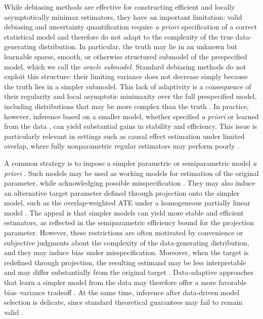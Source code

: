 \documentclass[11pt]{article}
\theoremstyle{definition}
\begin{document}
While debiasing methods are effective for constructing efficient and locally asymptotically minimax estimators, they have an important limitation: valid debiasing and uncertainty quantification require \textit{a priori} specification of a correct statistical model and therefore do not adapt to the complexity of the true data-generating distribution. In particular, the truth may lie in an unknown but learnable sparse, smooth, or otherwise structured submodel of the prespecified model, which we call the \emph{oracle submodel}. Standard debiasing methods do not exploit this structure: their limiting variance does not decrease simply because the truth lies in a simpler submodel. This lack of adaptivity is a consequence of their regularity and local asymptotic minimaxity over the full prespecified model, including distributions that may be more complex than the truth \citep{hajek1972local, vandervaart2000asymptotic}. In practice, however, inference based on a smaller model, whether specified \textit{a priori} \citep{imbensOverlapEstimand2006} or learned from the data \citep{moosavi2023costs}, can yield substantial gains in stability and efficiency. This issue is particularly relevant in settings such as causal effect estimation under limited overlap, where fully nonparametric regular estimators may perform poorly \citep{CTMLE, ATEsupereff, d2021deconfounding, moosavi2023costs}.


 
 
A common strategy is to impose a simpler parametric or semiparametric model \textit{a priori} \citep{imbensOverlapEstimand2006, li2019overlapWeights, vansteelandt2022assumption, vansteelandt2024assumption}. Such models may be used as working models for estimation of the original parameter, while acknowledging possible misspecification \citep{white1982MLErobust, buja2019models, buja2019models2}. They may also induce an alternative target parameter defined through projection onto the simpler model, such as the overlap-weighted ATE under a homogeneous partially linear model \citep{robinson1988root, imbensOverlapEstimand2006, li2019overlapWeights}. The appeal is that simpler models can yield more stable and efficient estimators, as reflected in the semiparametric efficiency bound for the projection parameter. However, these restrictions are often motivated by convenience or subjective judgments about the complexity of the data-generating distribution, and they may induce bias under misspecification. Moreover, when the target is redefined through projection, the resulting estimand may be less interpretable and may differ substantially from the original target \citep{whitney2020comment}. Data-adaptive approaches that learn a simpler model from the data may therefore offer a more favorable bias--variance tradeoff \citep{CTMLE, moosavi2023costs, van2024adaptive, li2025regularized}. At the same time, inference after data-driven model selection is delicate, since standard theoretical guarantees may fail to remain valid \citep{bauer1988model, potscher1991effects, buhlmann1999efficient, hjort2003frequentist, bunea2004consistent, LeebModelSelect2005, claeskens2007asymptotic}.
\end{document}
